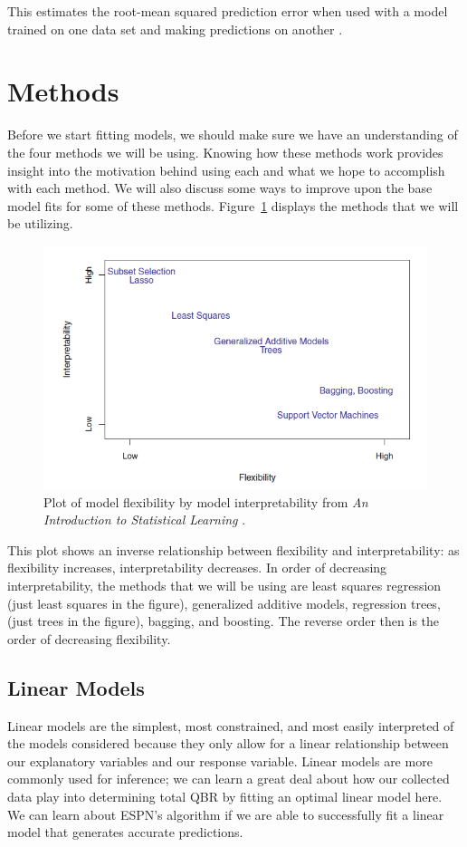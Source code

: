 \documentclass[12pt]{article}\usepackage[]{graphicx}\usepackage[]{color}
\begin{document}
\noindent
This estimates the root-mean squared prediction error when used with a model trained on one data set and making predictions on another \cite{gam}.

\section{Methods}
Before we start fitting models, we should make sure we have an understanding of the four methods we will be using. Knowing how these methods work provides insight into the motivation behind using each and what we hope to accomplish with each method. We will also discuss some ways to improve upon the base model fits for some of these methods. Figure~\ref{fig:flexinterp} displays the methods that we will be utilizing.

\begin{figure}[h]
	\centering
	\includegraphics[width=\textwidth]{flexinterp.png}
	\captionsetup{font=footnotesize,labelfont=footnotesize}
	\caption{\label{fig:flexinterp} Plot of model flexibility by model interpretability from \textit{An Introduction to Statistical Learning} \cite{gam}.}
\end{figure}

\newpage
This plot shows an inverse relationship between flexibility and interpretability: as flexibility increases, interpretability decreases. In order of decreasing interpretability, the methods that we will be using are least squares regression (just least squares in the figure), generalized additive models, regression trees, (just trees in the figure), bagging, and boosting. The reverse order then is the order of decreasing flexibility.

\subsection{Linear Models}
Linear models are the simplest, most constrained, and most easily interpreted of the models considered because they only allow for a linear relationship between our explanatory variables and our response variable. Linear models are more commonly used for inference; we can learn a great deal about how our collected data play into determining total QBR by fitting an optimal linear model here. We can learn about ESPN's algorithm if we are able to successfully fit a linear model that generates accurate predictions.
\end{document}
